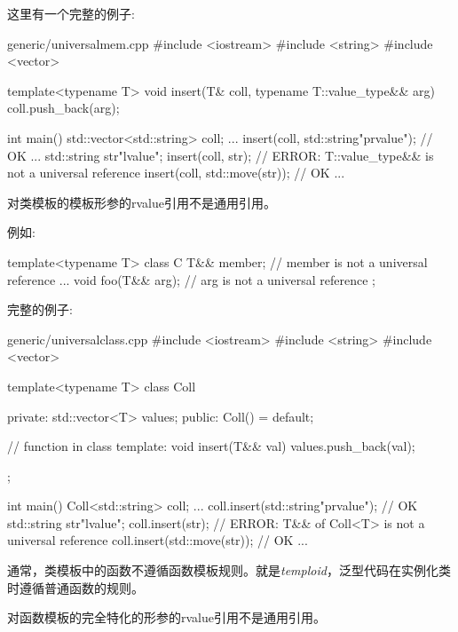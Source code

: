 这里有一个完整的例子:\par

\begin{codeboxt}[cpp]{generic/universalmem.cpp}
#include <iostream>
#include <string>
#include <vector>

template<typename T>
void insert(T& coll, typename T::value_type&& arg)
{
  coll.push_back(arg);
}

int main()
{
  std::vector<std::string> coll;
  ...
  insert(coll, std::string{"prvalue"}); // OK
  ...
  std::string str{"lvalue"};
  insert(coll, str); // ERROR: T::value_type&& is not a universal reference
  insert(coll, std::move(str)); // OK
  ...
}
\end{codeboxt}


对类模板的模板形参的rvalue引用不是通用引用。\par

例如:\par

\begin{codebox}[cpp]
template<typename T>
class C {
  T&& member; // member is not a universal reference
  ...
  void foo(T&& arg); // arg is not a universal reference
};
\end{codebox}

完整的例子:\par

\begin{codeboxt}[cpp]{generic/universalclass.cpp}
#include <iostream>
#include <string>
#include <vector>

template<typename T>
class Coll {
private:
  std::vector<T> values;
public:
  Coll() = default;

  // function in class template:
  void insert(T&& val) {
    values.push_back(val);
  }
};

int main()
{
  Coll<std::string> coll;
  ...
  coll.insert(std::string{"prvalue"}); // OK
  std::string str{"lvalue"};
  coll.insert(str); // ERROR: T&& of Coll<T> is not a universal reference
  coll.insert(std::move(str)); // OK
  ...
}
\end{codeboxt}

通常，类模板中的函数不遵循函数模板规则。就是\textit{temploid}，泛型代码在实例化类时遵循普通函数的规则。\par


对函数模板的完全特化的形参的rvalue引用不是通用引用。\par

